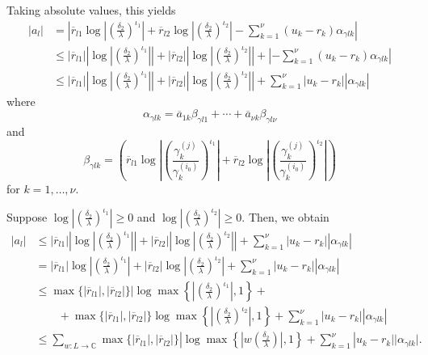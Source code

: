 Taking absolute values, this yields
\begin{align*}
|a_l| 	& = \left|\overline{r}_{l1}\log\left|\left(\frac{\delta_2}{\lambda}\right)^{\iota_1}\right| + \overline{r}_{l2}\log\left|\left(\frac{\delta_2}{\lambda}\right)^{\iota_2}\right| - \sum_{k=1}^{\nu}(u_k-r_k)\alpha_{\gamma l k}\right|\\
	& \leq |\overline{r}_{l1}|\left|\log\left|\left(\frac{\delta_2}{\lambda}\right)^{\iota_1}\right|\right| + |\overline{r}_{l2}|\left|\log\left|\left(\frac{\delta_2}{\lambda}\right)^{\iota_2}\right|\right| + \left| - \sum_{k=1}^{\nu}(u_k-r_k)\alpha_{\gamma l k}\right|\\
	& \leq |\overline{r}_{l1}|\left|\log\left|\left(\frac{\delta_2}{\lambda}\right)^{\iota_1}\right|\right| + |\overline{r}_{l2}|\left|\log\left|\left(\frac{\delta_2}{\lambda}\right)^{\iota_2}\right|\right| + \sum_{k=1}^{\nu}|u_k-r_k||\alpha_{\gamma l k}|
\end{align*}
where
\[\alpha_{\gamma l k} = \overline{a}_{1k}\beta_{\gamma l 1} + \cdots + \overline{a}_{\nu k}\beta_{\gamma l \nu}\]
and
\[\beta_{\gamma l k} = \left(\overline{r}_{l1} \log\left| \left( \frac{\gamma_k^{(j)}}{\gamma_k^{(i_0)}}\right)^{\iota_1}\right|+ \overline{r}_{l2}\log\left| \left( \frac{\gamma_k^{(j)}}{\gamma_k^{(i_0)}}\right)^{\iota_2}\right|\right)\]
for $k = 1, \dots, \nu$.

Suppose $\log\left|\left(\frac{\delta_2}{\lambda}\right)^{\iota_1}\right| \geq 0$ and $\log\left|\left(\frac{\delta_2}{\lambda}\right)^{\iota_2}\right| \geq 0$. Then, we obtain
\begin{align*}
|a_l| 	& \leq |\overline{r}_{l1}|\left|\log\left|\left(\frac{\delta_2}{\lambda}\right)^{\iota_1}\right|\right| + |\overline{r}_{l2}|\left|\log\left|\left(\frac{\delta_2}{\lambda}\right)^{\iota_2}\right|\right| + \sum_{k=1}^{\nu}|u_k-r_k||\alpha_{\gamma l k}|\\
	& = |\overline{r}_{l1}|\log\left|\left(\frac{\delta_2}{\lambda}\right)^{\iota_1}\right| + |\overline{r}_{l2}|\log\left|\left(\frac{\delta_2}{\lambda}\right)^{\iota_2}\right| + \sum_{k=1}^{\nu}|u_k-r_k||\alpha_{\gamma l k}|\\
	& \leq \max\{|\overline{r}_{l1}|, |\overline{r}_{l2}|\}|\log\max\left\{\left|\left(\frac{\delta_2}{\lambda}\right)^{\iota_1}\right|,1\right\} + \\
	& \quad \quad +\max\{|\overline{r}_{l1}|, |\overline{r}_{l2}|\}\log\max\left\{\left|\left(\frac{\delta_2}{\lambda}\right)^{\iota_2}\right|,1\right\} + \sum_{k=1}^{\nu}|u_k-r_k||\alpha_{\gamma l k}|\\
	&  \leq \sum_{w: L \to \mathbb{C}}\max\{|\overline{r}_{l1}|, |\overline{r}_{l2}|\}|\log\max\left\{\left|w\left(\frac{\delta_2}{\lambda}\right)\right|,1\right\} + \sum_{k=1}^{\nu}|u_k-r_k||\alpha_{\gamma l k}|.
\end{align*}

